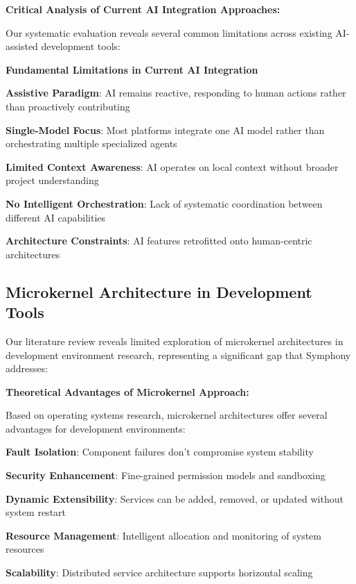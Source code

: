 \textbf{Critical Analysis of Current AI Integration Approaches:}

Our systematic evaluation reveals several common limitations across existing AI-assisted development tools:

\begin{alertbox}
\textbf{Fundamental Limitations in Current AI Integration}

\begin{expandedlist}
    \item \textbf{Assistive Paradigm}: AI remains reactive, responding to human actions rather than proactively contributing
    \item \textbf{Single-Model Focus}: Most platforms integrate one AI model rather than orchestrating multiple specialized agents
    \item \textbf{Limited Context Awareness}: AI operates on local context without broader project understanding
    \item \textbf{No Intelligent Orchestration}: Lack of systematic coordination between different AI capabilities
    \item \textbf{Architecture Constraints}: AI features retrofitted onto human-centric architectures
\end{expandedlist}
\end{alertbox}

\subsection{Microkernel Architecture in Development Tools}
\label{subsec:microkernel-analysis}

Our literature review reveals limited exploration of microkernel architectures in development environment research, representing a significant gap that Symphony addresses:

\textbf{Theoretical Advantages of Microkernel Approach:}

Based on operating systems research, microkernel architectures offer several advantages for development environments:

\begin{compactlist}
    \item \textbf{Fault Isolation}: Component failures don't compromise system stability
    \item \textbf{Security Enhancement}: Fine-grained permission models and sandboxing
    \item \textbf{Dynamic Extensibility}: Services can be added, removed, or updated without system restart
    \item \textbf{Resource Management}: Intelligent allocation and monitoring of system resources
    \item \textbf{Scalability}: Distributed service architecture supports horizontal scaling
\end{compactlist}

